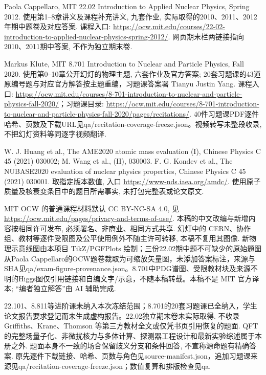 Paola Cappellaro, MIT 22.02 Introduction to Applied Nuclear Physics, Spring 2012. 使用第1--8章讲义及课程补充讲义, 九套作业, 实际取得的2010、2011、2012年期中题卷及对应答案. 课程入口: \url{https://ocw.mit.edu/courses/22-02-introduction-to-applied-nuclear-physics-spring-2012/}. 网页期末栏两链接指向2010、2011期中答案, 不作为独立期末卷.

Markus Klute, MIT 8.701 Introduction to Nuclear and Particle Physics, Fall 2020. 使用第0--10章公开幻灯的物理主题, 六套作业及官方答案; 20套习题课的43道原编号题与对应官方解答按主题重编，习题课答案署 Tianyu Justin Yang. 课程入口: \url{https://ocw.mit.edu/courses/8-701-introduction-to-nuclear-and-particle-physics-fall-2020/}；习题课目录: \url{https://ocw.mit.edu/courses/8-701-introduction-to-nuclear-and-particle-physics-fall-2020/pages/recitations/}. 40件习题课PDF逐件哈希、页数及下载URL见qa/recitation-coverage-freeze.json。视频转写未整段收录, 不把幻灯资料等同逐字视频翻译.

W. J. Huang et al., The AME2020 atomic mass evaluation (I), Chinese Physics C 45 (2021) 030002; M. Wang et al., (II), 030003. F. G. Kondev et al., The NUBASE2020 evaluation of nuclear physics properties, Chinese Physics C 45 (2021) 030001. 取指定版本数值, 入口 \url{https://www-nds.iaea.org/amdc/}. 使用原子质量及核衰变条目中的题目所需事实, 未打包完整表或论文原文.

MIT OCW 的普通课程材料默认 CC BY-NC-SA 4.0, 见 \url{https://ocw.mit.edu/pages/privacy-and-terms-of-use/}. 本稿的中文改编与新增内容按相同许可发布, 必须署名、非商业、相同方式共享. 幻灯中的 CERN、协作组、教材等逐件受限图及公平使用例外不随主许可转移, 本稿不复用其图像. 新物理示意线图由本项目 TikZ/PGFPlots 绘制；三份22.02期中题不可缺少的原始题图从Paola Cappellaro的OCW题卷裁取为可缩放矢量图，未添加答案标注，来源与SHA见qa/exam-figure-provenance.json。8.701中PDG谱图、受限教材块及来源不明的Higgs图仅引用链接和自编文字/示意，不随本稿转载。本稿不是 MIT 官方译本; ``编者独立解答''由 AI 辅助完成.

22.101、8.811等进阶课未纳入本次冻结范围；8.701的20套习题课已全纳入，学生论文报告要求登记而未生成虚构报告。22.02独立期末卷未实际取得. 不收录 Griffiths、Krane、Thomson 等第三方教材全文或仅凭书页引用恢复的题面. QFT 的完整场量子化、非微扰核力与多体计算、探测器工程设计和最新实验综述属于本册之外. 题面本身不一致的场合保留歧义分支和条件回答, 不宣称源命题有精确答案. 原先逐件下载链接、哈希、页数与角色见source-manifest.json，追加习题课来源见qa/recitation-coverage-freeze.json；数值复算和排版检查见qa.
